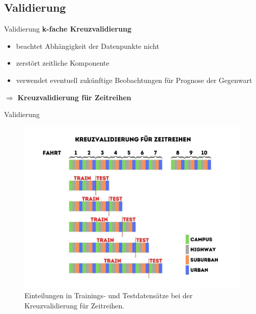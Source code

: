 \subsection{Validierung}
\begin{frame}{Validierung}
	\textbf{k-fache Kreuzvalidierung}
	\begin{itemize}
		\item beachtet Abhängigkeit der Datenpunkte nicht
		\item zerstört zeitliche Komponente
		\item verwendet eventuell zukünftige Beobachtungen für Prognose der Gegenwart
	\end{itemize}
	$\Rightarrow$ \textbf{Kreuzvalidierung für Zeitreihen}
\end{frame}

\begin{frame}{Validierung}
	\begin{figure}[h]
		\centering
		\includegraphics[scale=0.33]{kreuzvalidierung}
		\caption{Einteilungen in Trainings- und Testdatensätze bei der Kreuzvalidierung für Zeitreihen.}
		\label{kreuzvalidierung}
	\end{figure}
\end{frame}
